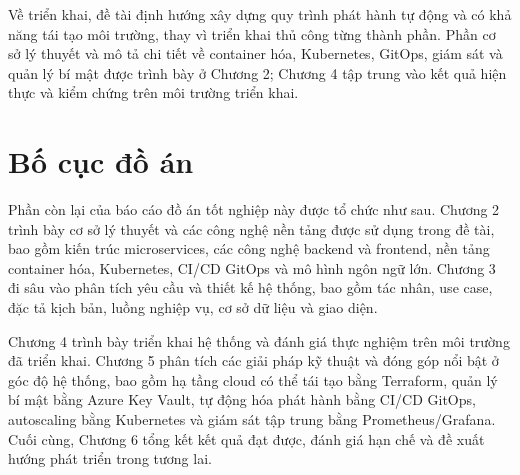 \documentclass[../DoAn.tex]{subfiles}
\begin{document}
Về triển khai, đề tài định hướng xây dựng quy trình phát hành tự động và có khả năng tái tạo môi trường, thay vì triển khai thủ công từng thành phần. Phần cơ sở lý thuyết và mô tả chi tiết về container hóa, Kubernetes, GitOps, giám sát và quản lý bí mật được trình bày ở Chương 2; Chương 4 tập trung vào kết quả hiện thực và kiểm chứng trên môi trường triển khai.

\section{Bố cục đồ án}
\label{section:1.4}
Phần còn lại của báo cáo đồ án tốt nghiệp này được tổ chức như sau. Chương 2 trình bày cơ sở lý thuyết và các công nghệ nền tảng được sử dụng trong đề tài, bao gồm kiến trúc microservices, các công nghệ backend và frontend, nền tảng container hóa, Kubernetes, CI/CD GitOps và mô hình ngôn ngữ lớn. Chương 3 đi sâu vào phân tích yêu cầu và thiết kế hệ thống, bao gồm tác nhân, use case, đặc tả kịch bản, luồng nghiệp vụ, cơ sở dữ liệu và giao diện.

Chương 4 trình bày triển khai hệ thống và đánh giá thực nghiệm trên môi trường đã triển khai. Chương 5 phân tích các giải pháp kỹ thuật và đóng góp nổi bật ở góc độ hệ thống, bao gồm hạ tầng cloud có thể tái tạo bằng Terraform, quản lý bí mật bằng Azure Key Vault, tự động hóa phát hành bằng CI/CD GitOps, autoscaling bằng Kubernetes và giám sát tập trung bằng Prometheus/Grafana. Cuối cùng, Chương 6 tổng kết kết quả đạt được, đánh giá hạn chế và đề xuất hướng phát triển trong tương lai.
\end{document}
